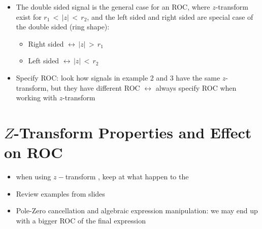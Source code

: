 \documentclass[12pt,a4paper]{book}
\begin{document}
\begin{itemize}
\begin{enumerate}
	\item Left sided signal $\leftrightarrow$ inside the circle
	
		\begin{itemize}
		\item  Example: $x[k] \, = \, - \, \alpha^k \, u[-k \, - \, 1] \, \leftrightarrow \, \displaystyle\frac{z}{z \, - \, \alpha}\quad $ ROC: $\lvert \, z \, \rvert \, < \, \alpha \leftrightarrow \text{Radius $<$ pole}$
		\end{itemize}
	
	\item Double sided signal $\leftrightarrow$ inside a ring (donate shape)
	\end{enumerate}


\item The double sided signal is the general case for an ROC, where $z$-transform exist for  $r_1 \, < \, \lvert z \rvert \, < \, r_2$, and the left sided and right sided are special case of the double sided (ring shape):
    
    \begin{itemize}
        \item Right sided $ \leftrightarrow \, \lvert z \rvert \, > \, r_1$
        
        \item Left sided $ \leftrightarrow \, \lvert z \rvert \, < \, r_2$
    \end{itemize}


\item Specify ROC: look how signals in example 2 and 3 have the same $z$-transform, but they have different ROC $\leftrightarrow$ always specify ROC when working with $z$-transform 

\end{itemize}


\section{$Z$-Transform Properties and Effect on ROC}

\begin{itemize}

\item when using $z-$transform , keep  at what happen to the 

\item Review examples from slides

\item Pole-Zero cancellation and algebraic expression manipulation: we may end up with a bigger ROC of the final expression


\end{itemize}
\end{document}
